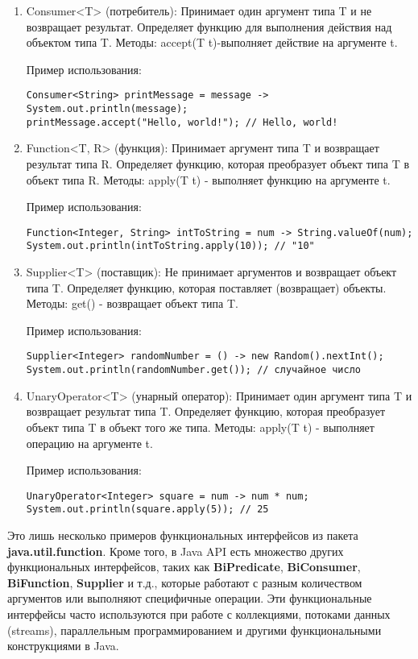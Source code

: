 \documentclass[12pt, a4paper]{book}%
\begin{document}
{\begin{enumerate}
Пример использования:
\begin{lstlisting}
Predicate<Integer> isPositive = num -> num > 0;
System.out.println(isPositive.test(5)); // true
\end{lstlisting}
\item Consumer<T> (потребитель): Принимает один аргумент типа T и не возвращает результат. Определяет функцию для выполнения действия над объектом типа T. Методы: accept(T t)-выполняет действие на аргументе t.

Пример использования:
\begin{lstlisting}
Consumer<String> printMessage = message -> System.out.println(message);
printMessage.accept("Hello, world!"); // Hello, world!
\end{lstlisting}
\item Function<T, R> (функция): Принимает аргумент типа T и возвращает результат типа R. Определяет функцию, которая преобразует объект типа T в объект типа R. Методы: apply(T t) - выполняет функцию на аргументе t.

Пример использования:
\begin{lstlisting}
Function<Integer, String> intToString = num -> String.valueOf(num);
System.out.println(intToString.apply(10)); // "10"
\end{lstlisting}

\item Supplier<T> (поставщик): Не принимает аргументов и возвращает объект типа T. Определяет функцию, которая поставляет (возвращает) объекты. Методы: get() - возвращает объект типа T.

Пример использования:
\begin{lstlisting}
Supplier<Integer> randomNumber = () -> new Random().nextInt();
System.out.println(randomNumber.get()); // случайное число
\end{lstlisting}
\item UnaryOperator<T> (унарный оператор): Принимает один аргумент типа T и возвращает результат типа T. Определяет функцию, которая преобразует объект типа T в объект того же типа. Методы: apply(T t) - выполняет операцию на аргументе t.

Пример использования:
\begin{lstlisting}
UnaryOperator<Integer> square = num -> num * num;
System.out.println(square.apply(5)); // 25
\end{lstlisting}
\end{enumerate}

Это лишь несколько примеров функциональных интерфейсов из пакета {\bf java.util.function}. Кроме того, в Java API есть множество других функциональных интерфейсов, таких как {\bf BiPredicate}, {\bf BiConsumer}, {\bf BiFunction}, {\bf Supplier} и т.д., которые работают с разным количеством аргументов или выполняют специфичные операции. Эти функциональные интерфейсы часто используются при работе с коллекциями, потоками данных (streams), параллельным программированием и другими функциональными конструкциями в Java.
}
\end{document}
